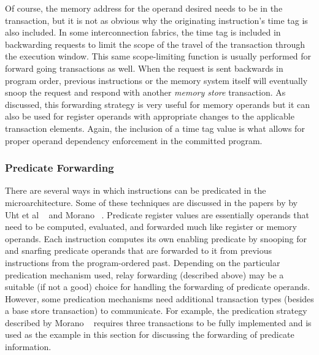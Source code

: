 \documentclass{book}
\begin{document}
%
Of course, the memory address for the operand desired
needs to be in the transaction, but it is not as obvious why
the originating instruction's time tag is also included.  In some
interconnection fabrics, the time tag is included in backwarding
requests to limit the scope of the travel of the transaction
through the execution window.  This same scope-limiting function
is usually performed for forward going transactions as well.
When the request is sent backwards in program order, previous
instructions or the memory system itself will eventually snoop
the request and respond with another \textit{memory store}
transaction.
As discussed, this forwarding strategy is very useful for memory
operands but it can also be used for register operands with
appropriate changes to the applicable transaction elements.
Again, the inclusion of a time tag value is what allows
for proper operand dependency enforcement
in the committed program.
%
%
\subsubsection{Predicate Forwarding}
%
There are several ways in which instructions can be predicated
in the microarchitecture.  
Some of these techniques are discussed in the papers by
by Uht et al ~\cite{Uht01} and Morano ~\cite{Morano02}.
Predicate register values are essentially
operands that need to be computed, evaluated, and forwarded
much like register or memory operands.
Each instruction computes its own enabling predicate by
snooping for and snarfing predicate operands that are forwarded
to it from previous instructions from the program-ordered past.
Depending on the particular predication mechanism used,
relay forwarding (described above) may be a suitable (if not a good) choice 
for handling the forwarding of predicate operands.
However, some predication mechanisms need additional transaction
types (besides a base store transaction) to communicate.
For example, the predication strategy described by Morano ~\cite{Morano02}
requires three transactions to be fully implemented and is
used as the example in this section for discussing the forwarding
of predicate information.
\end{document}
